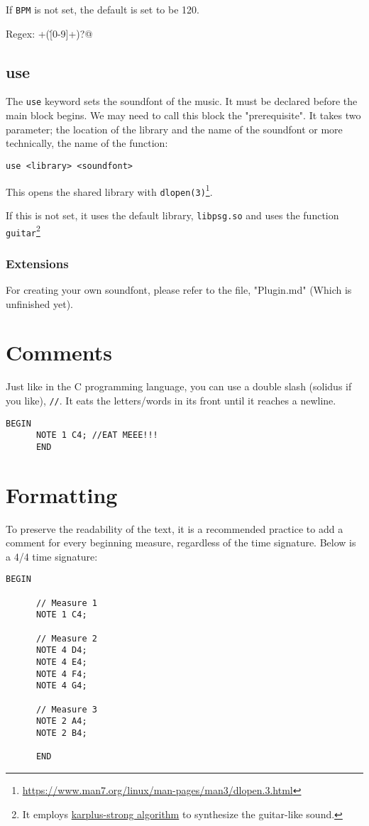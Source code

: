 \documentclass{article}
\begin{document}
If \verb+BPM+ is not set, the default is set to be 120.

Regex: \verb@[0-9]+(\.[0-9]+)?@
\subsection{use}

The \verb+use+ keyword sets the soundfont of the music. It must be declared before the main block begins.
We may need to call this block the "prerequisite".
It takes two parameter; the location of the library and the name of the soundfont
or more technically, the name of the function:
\begin{Verbatim}[frame=single]
      use <library> <soundfont>
\end{Verbatim}

This opens the shared library with \verb+dlopen(3)+\footnote{\url{https://www.man7.org/linux/man-pages/man3/dlopen.3.html}}.

If this is not set, it uses the default library, \verb+libpsg.so+ and uses the function \verb+guitar+\footnote{It employs \href{wikipedia.org/wiki/Karplus\%E2\%80\%93Strong_string_synthesis}{karplus-strong algorithm} to synthesize the guitar-like sound.}

\subsubsection{Extensions}
For creating your own soundfont, please refer to the file, "Plugin.md" (Which is unfinished yet).

\section{Comments}
Just like in the C programming language, you can use a double slash (solidus if you like), \verb+//+.
It eats the letters/words in its front until it reaches a newline.
\begin{Verbatim}[frame=single]
      BEGIN
      NOTE 1 C4; //EAT MEEE!!!
      END
\end{Verbatim}

\section{Formatting}
To preserve the readability of the text, it is a recommended practice to add a comment for every
beginning measure, regardless of the time signature. Below is a 4/4 time signature:
\begin{Verbatim}[frame=single]
      BEGIN

      // Measure 1
      NOTE 1 C4;

      // Measure 2
      NOTE 4 D4;
      NOTE 4 E4;
      NOTE 4 F4;
      NOTE 4 G4;

      // Measure 3
      NOTE 2 A4;
      NOTE 2 B4;

      END
\end{Verbatim}
\end{document}
